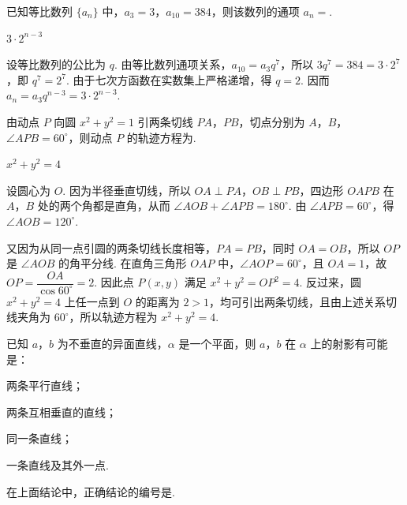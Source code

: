 \begin{problem}
已知等比数列 \(\{a_n\}\) 中，\(a_3=3\)，\(a_{10}=384\)，则该数列的通项 \(a_n=\)\fillinblank{}.
\end{problem}

\begin{answer}
\(3\cdot2^{n-3}\)
\end{answer}

\begin{solution}
设等比数列的公比为 \(q\). 由等比数列通项关系，\(a_{10}=a_3q^7\)，所以 \(3q^7=384=3\cdot2^7\)，即 \(q^7=2^7\). 由于七次方函数在实数集上严格递增，得 \(q=2\). 因而 \(a_n=a_3q^{n-3}=3\cdot2^{n-3}\).
\end{solution}

\begin{problem}
由动点 \(P\) 向圆 \(x^2+y^2=1\) 引两条切线 \(PA\)，\(PB\)，切点分别为 \(A\)，\(B\)，\(\angle APB=60^{\circ}\)，则动点 \(P\) 的轨迹方程为\fillinblank{}.
\end{problem}

\begin{answer}
\(x^2+y^2=4\)
\end{answer}

\begin{solution}
设圆心为 \(O\). 因为半径垂直切线，所以 \(OA\perp PA\)，\(OB\perp PB\)，四边形 \(OAPB\) 在 \(A\)，\(B\) 处的两个角都是直角，从而 \(\angle AOB+\angle APB=180^{\circ}\). 由 \(\angle APB=60^{\circ}\)，得 \(\angle AOB=120^{\circ}\).

又因为从同一点引圆的两条切线长度相等，\(PA=PB\)，同时 \(OA=OB\)，所以 \(OP\) 是 \(\angle AOB\) 的角平分线. 在直角三角形 \(OAP\) 中，\(\angle AOP=60^{\circ}\)，且 \(OA=1\)，故 \(OP=\dfrac{OA}{\cos60^{\circ}}=2\). 因此点 \(P(x,y)\) 满足 \(x^2+y^2=OP^2=4\). 反过来，圆 \(x^2+y^2=4\) 上任一点到 \(O\) 的距离为 \(2>1\)，均可引出两条切线，且由上述关系切线夹角为 \(60^{\circ}\)，所以轨迹方程为 \(x^2+y^2=4\).
\end{solution}

\begin{problem}
已知 \(a\)，\(b\) 为不垂直的异面直线，\(\alpha\) 是一个平面，则 \(a\)，\(b\) 在 \(\alpha\) 上的射影有可能是：

\begin{circlelist}
\item 两条平行直线；
\item 两条互相垂直的直线；
\item 同一条直线；
\item 一条直线及其外一点.
\end{circlelist}

在上面结论中，正确结论的编号是\fillinblank{}.
\end{problem}

